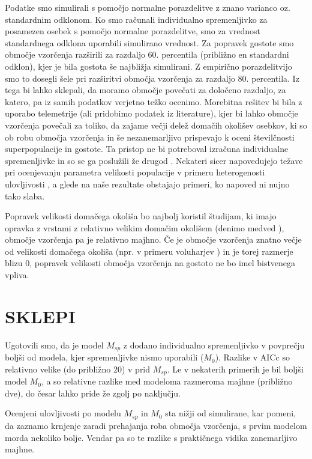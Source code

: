 Podatke smo simulirali s pomočjo normalne porazdelitve z znano varianco oz. standardnim odklonom. Ko smo računali individualno spremenljivko za posamezen osebek s pomočjo normalne porazdelitve, smo za vrednost standardnega odklona uporabili simulirano vrednost. Za popravek gostote smo območje vzorčenja razširili za razdaljo 60. percentila (približno en standardni odklon), kjer je bila gostota še najbližja simulirani. Z empirično porazdelitvijo smo to dosegli šele pri razširitvi območja vzorčenja za razdaljo 80. percentila. Iz tega bi lahko sklepali, da moramo območje povečati za določeno razdaljo, za katero, pa iz samih podatkov verjetno težko ocenimo. Morebitna rešitev bi bila z uporabo telemetrije (ali pridobimo podatek iz literature), kjer bi lahko območje vzorčenja povečali za toliko, da zajame večji delež domačih okolišev osebkov, ki so ob robu območja vzorčenja in še nezanemarljivo prispevajo k oceni številčnosti superpopulacije in gostote. Ta pristop ne bi potreboval izračuna individualne spremenljivke in so se ga poslužili že drugod \citep{ivan-et-al-2013-aux}. Nekateri sicer napovedujejo težave pri ocenjevanju parametra velikosti populacije v primeru heterogenosti ulovljivosti \citep{link_nonidentifiability_2003}, a glede na naše rezultate obstajajo primeri, ko napoved ni nujno tako slaba.

Popravek velikosti domačega okoliša bo najbolj koristil študijam, ki imajo opravka z vrstami z relativno velikim domačim okolišem (denimo medved \citep{miller_brown_1997, whittington_comparison_2015}), območje vzorčenja pa je relativno majhno. Če je območje vzorčenja znatno večje od velikosti domačega okoliša (npr. v primeru voluharjev \citealp{erlinge_density-related_1990}) in je torej razmerje blizu 0, popravek velikosti območja vzorčenja na gostoto ne bo imel bistvenega vpliva.

\newpage
\section{SKLEPI}
Ugotovili smo, da je model $M_{sp}$ z dodano individualno spremenljivko v povprečju boljši od modela, kjer spremenljivke nismo uporabili ($M_0$). Razlike v AICc so relativno velike (do približno 20) v prid $M_{sp}$. Le v nekaterih primerih je bil boljši model $M_0$, a so relativne razlike med modeloma razmeroma majhne (približno dve), do česar lahko pride že zgolj po naključju.

Ocenjeni ulovljivosti po modelu $M_{sp}$ in $M_0$ sta nižji od simulirane, kar pomeni, da zaznamo krnjenje zaradi prehajanja roba območja vzorčenja, s prvim modelom morda nekoliko bolje. Vendar pa so te razlike s praktičnega vidika zanemarljivo majhne.

